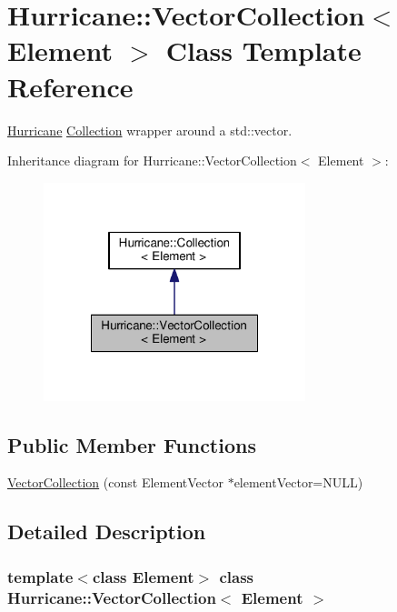 \hypertarget{classHurricane_1_1VectorCollection}{}\section{Hurricane\+:\+:Vector\+Collection$<$ Element $>$ Class Template Reference}
\label{classHurricane_1_1VectorCollection}


\hyperlink{namespaceHurricane}{Hurricane} \hyperlink{classHurricane_1_1Collection}{Collection} wrapper around a std\+::vector.  




Inheritance diagram for Hurricane\+:\+:Vector\+Collection$<$ Element $>$\+:\nopagebreak
\begin{figure}[H]
\begin{center}
\leavevmode
\includegraphics[width=216pt]{classHurricane_1_1VectorCollection__inherit__graph}
\end{center}
\end{figure}
\subsection*{Public Member Functions}
\begin{DoxyCompactItemize}
\item 
\hyperlink{classHurricane_1_1VectorCollection_a783d1c053ef4d46040db27bba255dfb8}{Vector\+Collection} (const Element\+Vector $\ast$element\+Vector=N\+U\+LL)
\end{DoxyCompactItemize}


\subsection{Detailed Description}
\subsubsection*{template$<$class Element$>$\newline
class Hurricane\+::\+Vector\+Collection$<$ Element $>$}


